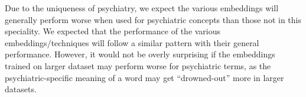 \documentclass[10pt]{article}
\begin{document}
Due to the uniqueness of psychiatry, we expect the various embeddings will generally perform worse when used for psychiatric concepts than those not in this speciality. We expected that the performance of the various embeddings/techniques will follow a similar pattern with their general performance. However, it would not be overly surprising if the embeddings trained on larger dataset may perform worse for psychiatric terms, as the psychiatric-specific meaning of a word may get ``drowned-out'' more in larger datasets. 
%
%
%
%
%
%
%
%
\end{document}
